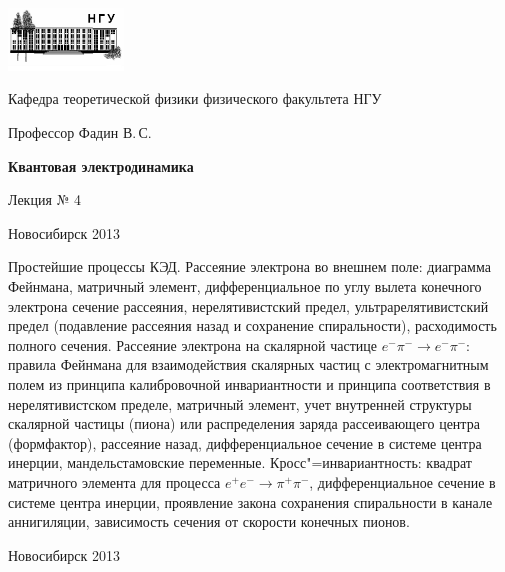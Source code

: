 \documentclass[12pt,pagesize,paper=192mm:108mm]{scrbook}
\begin{document}
\begin{titlepage}
  \vspace*{-1em}
  \begin{center}
    \includegraphics[width=0.23\textwidth]{../NSU-logo}

    Кафедра теоретической физики физического факультета НГУ
    \medskip

    \Large
    Профессор Фадин В.\,С.
    \bigskip

    \huge
    \textbf{Квантовая электродинамика}
    \bigskip

    \Large
    Лекция № 4
    \vfill

    \normalsize
    \vfill

    \normalsize \ccbysa\hspace{0.5em}  Новосибирск 2013
  \end{center}
\end{titlepage}
\newpage

\vspace*{-1em}
\begin{center}
\vfill
  \begin{minipage}{0.75\linewidth}
    Простейшие процессы КЭД. Рассеяние электрона во внешнем поле:
    диаграмма Фейнмана, матричный элемент, дифференциальное по углу
    вылета конечного электрона сечение рассеяния, нерелятивистский
    предел, ультрарелятивистский предел (подавление рассеяния назад и
    сохранение спиральности), расходимость полного сечения. Рассеяние
    электрона на скалярной частице $e^-\pi^-\to e^-\pi^-$: правила
    Фейнмана для взаимодействия скалярных частиц с электромагнитным
    полем из принципа калибровочной инвариантности и принципа
    соответствия в нерелятивистском пределе, матричный элемент, учет
    внутренней структуры скалярной частицы (пиона) или распределения
    заряда рассеивающего центра (формфактор), рассеяние назад,
    дифференциальное сечение в системе центра инерции,
    мандельстамовские переменные. Кросс"=инвариантность: квадрат
    матричного элемента для процесса $e^+e^-\to\pi^+\pi^-$,
    дифференциальное сечение в системе центра инерции, проявление
    закона сохранения спиральности в канале аннигиляции, зависимость
    сечения от скорости конечных пионов.
  \end{minipage}
  \vfill

  \normalsize \ccbysa\hspace{0.5em} Новосибирск 2013
\end{center}
\end{document}
